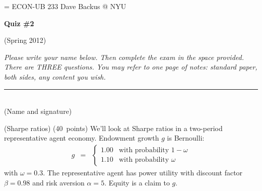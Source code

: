\documentclass[11pt]{exam}
\begin{document}
\parskip=\bigskipamount
\parindent=0.0in
\thispagestyle{empty}
{\large ECON-UB 233 \hfill Dave Backus @ NYU}

\bigskip\bigskip
\centerline{\Large \bf Quiz \#2}
\centerline{(Spring 2012)}

\bigskip
{\it Please write your name below.
Then complete the exam in the space provided.
There are THREE questions.
You may refer to one page of notes:
standard paper, both sides, any content you wish.}

\bigskip
\begin{flushleft}
\rule{4in}{0.5pt} \\ (Name and signature)
\end{flushleft}


\begin{questions}
\question (Sharpe ratios) (40~points)
We'll look at Sharpe ratios in a two-period representative agent economy.
Endowment growth $g$ is Bernoulli:
\begin{eqnarray*}
    g &=&
        \left\{
        \begin{array}{ll}
            1.00    &  \mbox{with probability } 1-\omega \\
            1.10    &  \mbox{with probability } \omega
        \end{array}
        \right.
\end{eqnarray*}
with $\omega = 0.3$.
The representative agent has power utility with discount factor $\beta = 0.98$
and risk aversion $\alpha = 5$.
Equity is a claim to $g$.



\end{questions}
\end{document}
